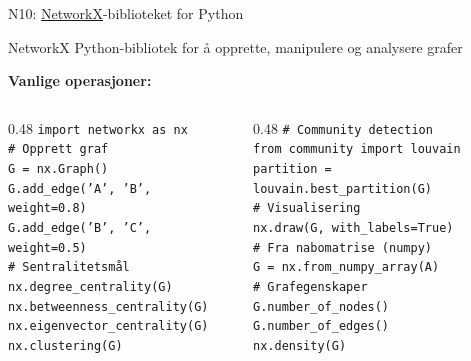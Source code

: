 \documentclass[aspectratio=169, 10pt]{beamer}
\begin{document}
\begin{frame}{N10: \href{https://networkx.org/}{NetworkX}-biblioteket for Python}
    
    \begin{block}{NetworkX}
        Python-bibliotek for å opprette, manipulere og analysere grafer
    \end{block}
    
    \vspace{2mm}
    
    \textbf{Vanlige operasjoner:}
    
    \begin{columns}
        \begin{column}{0.48\textwidth}
            \texttt{\small import networkx as nx} \\[2mm]
            \texttt{\small \# Opprett graf} \\
            \texttt{\small G = nx.Graph()} \\
            \texttt{\small G.add\_edge('A', 'B', weight=0.8)} \\
            \texttt{\small G.add\_edge('B', 'C', weight=0.5)} \\[2mm]
            \texttt{\small \# Sentralitetsmål} \\
            \texttt{\small nx.degree\_centrality(G)} \\
            \texttt{\small nx.betweenness\_centrality(G)} \\
            \texttt{\small nx.eigenvector\_centrality(G)} \\
            \texttt{\small nx.clustering(G)}
        \end{column}
        
        \begin{column}{0.48\textwidth}
            \texttt{\small \# Community detection} \\
            \texttt{\small from community import louvain} \\
            \texttt{\small partition = louvain.best\_partition(G)} \\[2mm]
            \texttt{\small \# Visualisering} \\
            \texttt{\small nx.draw(G, with\_labels=True)} \\[2mm]
            \texttt{\small \# Fra nabomatrise (numpy)} \\
            \texttt{\small G = nx.from\_numpy\_array(A)} \\[2mm]
            \texttt{\small \# Grafegenskaper} \\
            \texttt{\small G.number\_of\_nodes()} \\
            \texttt{\small G.number\_of\_edges()} \\
            \texttt{\small nx.density(G)}
        \end{column}
    \end{columns}
    
\end{frame}
\end{document}
